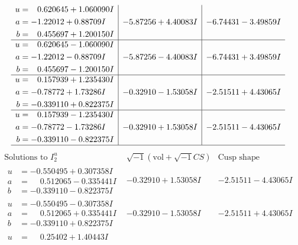 \documentclass[1p]{elsarticle_modified}
\theoremstyle{definition}
\newcommand{\I}{\sqrt{-1}}
\begin{document}
$$\begin{array}{c|c|c}
\begin{aligned}
u &= \phantom{-}0.620645 + 1.060090 I \\
a &= -1.22012 + 0.88709 I \\
b &= \phantom{-}0.455697 + 1.200150 I\end{aligned}
 & -5.87256 + 4.40083 I & -6.74431 - 3.49859 I \\ \hline\begin{aligned}
u &= \phantom{-}0.620645 - 1.060090 I \\
a &= -1.22012 - 0.88709 I \\
b &= \phantom{-}0.455697 - 1.200150 I\end{aligned}
 & -5.87256 - 4.40083 I & -6.74431 + 3.49859 I \\ \hline\begin{aligned}
u &= \phantom{-}0.157939 + 1.235430 I \\
a &= -0.78772 + 1.73286 I \\
b &= -0.339110 + 0.822375 I\end{aligned}
 & -0.32910 - 1.53058 I & -2.51511 + 4.43065 I \\ \hline\begin{aligned}
u &= \phantom{-}0.157939 - 1.235430 I \\
a &= -0.78772 - 1.73286 I \\
b &= -0.339110 - 0.822375 I\end{aligned}
 & -0.32910 + 1.53058 I & -2.51511 - 4.43065 I\\
 \hline 
 \end{array}$$\newpage$$\begin{array}{c|c|c}  
\text{Solutions to }I^u_{2}& \I (\text{vol} + \sqrt{-1}CS) & \text{Cusp shape}\\
 \hline 
\begin{aligned}
u &= -0.550495 + 0.307358 I \\
a &= \phantom{-}0.512065 - 0.335441 I \\
b &= -0.339110 - 0.822375 I\end{aligned}
 & -0.32910 + 1.53058 I & -2.51511 - 4.43065 I \\ \hline\begin{aligned}
u &= -0.550495 - 0.307358 I \\
a &= \phantom{-}0.512065 + 0.335441 I \\
b &= -0.339110 + 0.822375 I\end{aligned}
 & -0.32910 - 1.53058 I & -2.51511 + 4.43065 I \\ \hline\begin{aligned}
u &= \phantom{-}0.25402 + 1.40443 I \\

\end{aligned}
\end{array}$$
\end{document}
